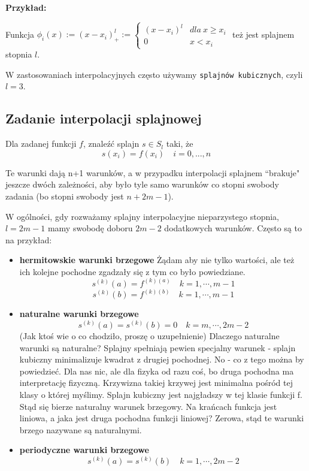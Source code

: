 \documentclass[hidelinks,a4paper,fleqn,oneside]{book}
\begin{document}
\textbf{Przykład:}

Funkcja $\phi_i(x) := (x-x_i)^l_+ := \left\{\begin{array}{lr}(x-x_i)^l & dla\ x \geq x_i \\ 0 & x<x_i\end{array}\right.$ też jest splajnem stopnia $l$.


W zastosowaniach interpolacyjnych często używamy \texttt{splajnów kubicznych}, czyli $l=3$.

\subsection{Zadanie interpolacji splajnowej} Dla zadanej funkcji $f$, znaleźć splajn $s \in S_l$ taki, że \[s(x_i) = f(x_i)\quad i=0, ..., n\]

Te warunki dają n+1 warunków, a w przypadku interpolacji splajnem ``brakuje" jeszcze dwóch zależności, aby było tyle samo warunków co stopni swobody zadania (bo stopni swobody jest $n+2m-1$).

W ogólności, gdy rozważamy splajny interpolacyjne nieparzystego stopnia, $l=2m-1$ mamy swobodę doboru $2m-2$ dodatkowych warunków. Często są to na przykład:

\begin{itemize}
	\item \textbf{hermitowskie warunki brzegowe}
	Żądam aby nie tylko wartości, ale też ich kolejne pochodne zgadzały się z tym co było powiedziane.
	\[
		s^{(k)}(a) = f^{(k)(a)} \quad k = 1, \cdots, m-1
	\]
	\[
		s^{(k)}(b) = f^{(k)(b)} \quad k = 1, \cdots, m-1
	\]
	
	\item \textbf{naturalne warunki brzegowe}
	\[
		s^{(k)}(a) = s^{(k)}(b) = 0 \quad k = m, \cdots, 2m-2
	\]
	(Jak ktoś wie o co chodziło, proszę o uzupełnienie) Dlaczego naturalne warunki są naturalne? Splajny spełniają pewien specjalny warunek - splajn kubiczny minimalizuje kwadrat z drugiej pochodnej. No - co z tego można by powiedzieć. Dla nas nic, ale dla fizyka od razu coś, bo druga pochodna ma interpretację fizyczną. Krzywizna takiej krzywej jest minimalna pośród tej klasy o której myślimy. Splajn kubiczny jest najgładszy w tej klasie funkcji f. Stąd się bierze naturalny warunek brzegowy. Na krańcach funkcja jest liniowa, a jaka jest druga pochodna funkcji liniowej? Zerowa, stąd te warunki brzego nazywane są naturalnymi.
	
	\item \textbf{periodyczne warunki brzegowe}
	\[
		s^{(k)}(a) = s^{(k)}(b) \quad k=1, \cdots, 2m-2
	\]
\end{itemize}
\end{document}
